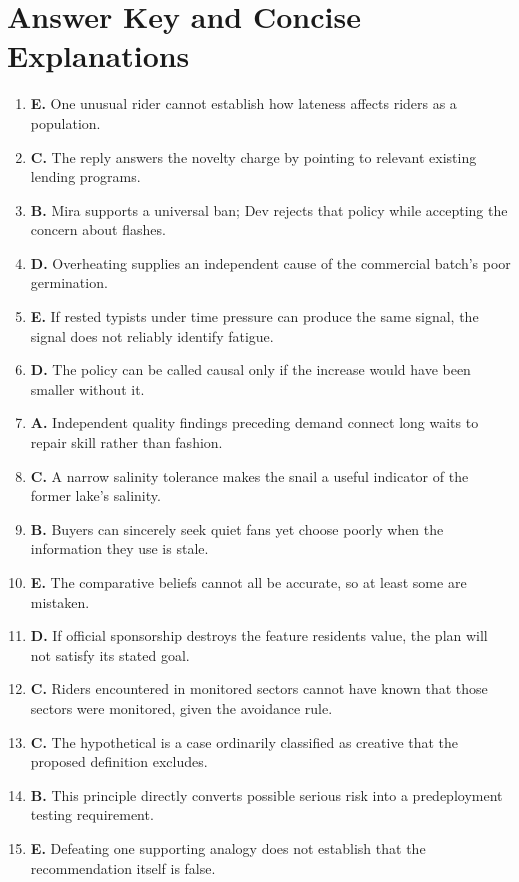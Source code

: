 \newpage
\section*{Answer Key and Concise Explanations}

\begin{enumerate}
\item \textbf{E.} One unusual rider cannot establish how lateness affects riders as a population.
\item \textbf{C.} The reply answers the novelty charge by pointing to relevant existing lending programs.
\item \textbf{B.} Mira supports a universal ban; Dev rejects that policy while accepting the concern about flashes.
\item \textbf{D.} Overheating supplies an independent cause of the commercial batch's poor germination.
\item \textbf{E.} If rested typists under time pressure can produce the same signal, the signal does not reliably identify fatigue.
\item \textbf{D.} The policy can be called causal only if the increase would have been smaller without it.
\item \textbf{A.} Independent quality findings preceding demand connect long waits to repair skill rather than fashion.
\item \textbf{C.} A narrow salinity tolerance makes the snail a useful indicator of the former lake's salinity.
\item \textbf{B.} Buyers can sincerely seek quiet fans yet choose poorly when the information they use is stale.
\item \textbf{E.} The comparative beliefs cannot all be accurate, so at least some are mistaken.
\item \textbf{D.} If official sponsorship destroys the feature residents value, the plan will not satisfy its stated goal.
\item \textbf{C.} Riders encountered in monitored sectors cannot have known that those sectors were monitored, given the avoidance rule.
\item \textbf{C.} The hypothetical is a case ordinarily classified as creative that the proposed definition excludes.
\item \textbf{B.} This principle directly converts possible serious risk into a predeployment testing requirement.
\item \textbf{E.} Defeating one supporting analogy does not establish that the recommendation itself is false.

\end{enumerate}
